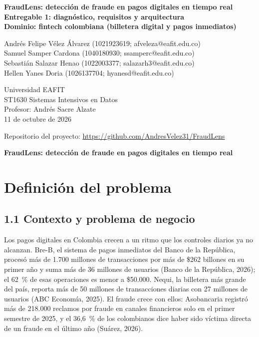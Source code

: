\documentclass[12pt,letterpaper]{article}
\begin{document}
\thispagestyle{plain}
\vspace*{1.4in}
\begin{center}
{\bfseries FraudLens: detección de fraude en pagos digitales en tiempo real\\[2pt]
Entregable 1: diagnóstico, requisitos y arquitectura\\[2pt]
Dominio: fintech colombiana (billetera digital y pagos inmediatos)}

\vspace{0.45in}
Andrés Felipe Vélez Álvarez (1021923619; afveleza@eafit.edu.co)\\
Samuel Samper Cardona (1040180930; ssamperc@eafit.edu.co)\\
Sebastián Salazar Henao (1022003377; salazarh3@eafit.edu.co)\\
Hellen Yanes Doria (1026137704; hyanesd@eafit.edu.co)

\vspace{0.4in}
Universidad EAFIT\\
ST1630 Sistemas Intensivos en Datos\\
Profesor: Andrés Sacre Alzate\\
11 de octubre de 2026

\vspace{0.3in}
{\small{}Repositorio del proyecto: \url{https://github.com/AndresVelez31/FraudLens}}
\end{center}
\clearpage
{}

\begin{center}
{\bfseries FraudLens: detección de fraude en pagos digitales en tiempo real}
\end{center}

\section{Definición del problema}

\subsection*{1.1 Contexto y problema de negocio}

Los pagos digitales en Colombia crecen a un ritmo que los controles diarios ya no alcanzan. Bre-B, el sistema de pagos inmediatos del Banco de la República, procesó más de 1.700 millones de transacciones por más de \$262 billones en su primer año y suma más de 36 millones de usuarios (Banco de la República, 2026); el 62~\% de esas operaciones es menor a \$50.000. Nequi, la billetera más grande del país, reporta más de 50 millones de transacciones diarias con 27 millones de usuarios (ABC Economía, 2025). El fraude crece con ellos: Asobancaria registró más de 218.000 reclamos por fraude en canales financieros solo en el primer semestre de 2025, y el 36,6~\% de los colombianos dice haber sido víctima directa de un fraude en el último año (Suárez, 2026).
\end{document}
